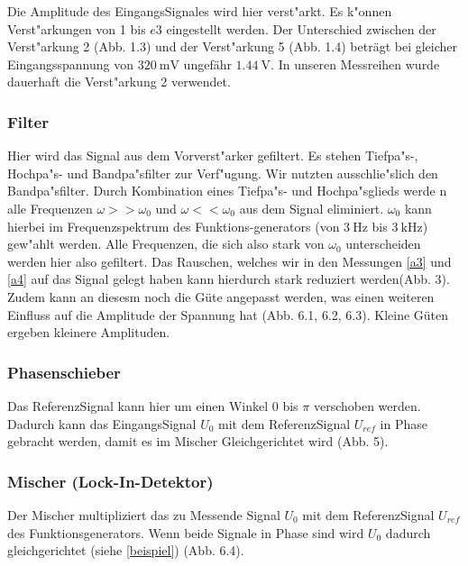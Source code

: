 \documentclass{scrartcl}
\begin{document}
				Die Amplitude des EingangsSignales wird hier verst"arkt. Es k"onnen Verst"arkungen von 1 bis $e3$ eingestellt werden.
				Der Unterschied zwischen der Verst"arkung 2 (Abb. 1.3) und der Verst"arkung 5 (Abb. 1.4) beträgt bei gleicher 
				Eingangsspannung von $\SI{320}{\milli\volt}$ ungefähr $\SI{1,44}{\volt}$. In unseren Messreihen wurde dauerhaft die Verst"arkung 2 verwendet. 

			\subsubsection{Filter}

				Hier wird das Signal aus dem Vorverst"arker gefiltert. Es stehen Tiefpa"s-, Hochpa"s- und Bandpa"sfilter zur Verf"ugung.
				Wir nutzten ausschlie"slich den Bandpa"sfilter. Durch Kombination eines Tiefpa"s- und Hochpa"sglieds werde n alle Frequenzen
				$\omega >> \omega_0$ und $\omega << \omega_0$ aus dem Signal eliminiert.
				$\omega_0$ kann hierbei im Frequenzspektrum des Funktions-generators (von $\SI{3}{\hertz}$ bis $\SI{3}{\kilo\hertz}$) gew"ahlt werden.
				Alle Frequenzen, die sich also stark von $\omega_0$ unterscheiden werden hier also gefiltert.
				Das Rauschen, welches wir in den Messungen \ref{a3} und \ref{a4} auf das Signal gelegt haben kann hierdurch stark reduziert werden(Abb. 3).
				Zudem kann an diesesm noch die Güte angepasst werden, was einen weiteren Einfluss auf die Amplitude der Spannung hat (Abb. 6.1, 6.2, 6.3).
				Kleine Güten ergeben kleinere Amplituden.

			\subsubsection{Phasenschieber}

				Das ReferenzSignal kann hier um einen Winkel $0$ bis $\pi$ verschoben werden.
				Dadurch kann das EingangsSignal $U_0$ mit dem ReferenzSignal $U_{ref}$ in Phase gebracht werden,
				damit es im Mischer Gleichgerichtet wird (Abb. 5).

			\subsubsection{Mischer (Lock-In-Detektor)}

				Der Mischer multipliziert das zu Messende Signal $U_0$ mit dem ReferenzSignal $U_{ref}$ des Funktionsgenerators. Wenn beide Signale in Phase sind wird $U_0$ dadurch gleichgerichtet (siehe \vref{beispiel}) (Abb. 6.4).
\end{document}
